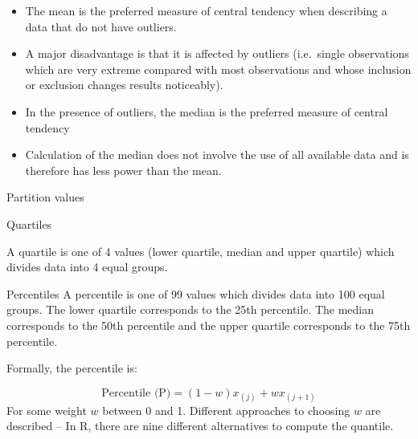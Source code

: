 \documentclass[
  ignorenonframetext,
  aspectratio=169]{beamer}
\providecommand{\tightlist}{%
  \setlength{\itemsep}{0pt}\setlength{\parskip}{0pt}}
\begin{document}
\begin{frame}{}
\protect\hypertarget{section-3}{}
\begin{itemize}
\tightlist
\item
  The mean is the preferred measure of central tendency when describing
  a data that do not have outliers.
\item
  A major disadvantage is that it is affected by outliers (i.e.~single
  observations which are very extreme compared with most observations
  and whose inclusion or exclusion changes results noticeably).
\item
  In the presence of outliers, the median is the preferred measure of
  central tendency
\item
  Calculation of the median does not involve the use of all available
  data and is therefore has less power than the mean.
\end{itemize}
\end{frame}

\begin{frame}{Partition values}
\protect\hypertarget{partition-values}{}
\begin{block}{Quartiles}

\small
A quartile is one of 4 values (lower quartile, median and upper quartile) which divides data into 4 equal groups.
\end{block}

\begin{block}{Percentiles}
\small
A percentile is one of 99 values which divides data into 100 equal groups. The lower quartile corresponds to the 25th percentile. The median corresponds to the 50th percentile and the upper quartile corresponds to the 75th percentile.

Formally, the percentile is:

$$
\text{Percentile (P)} = (1 - w)x_{(j)} + wx_{(j+1)}
$$
For some weight $w$ between 0 and 1. Different approaches to choosing $w$ are described -- In R, there are nine different alternatives to compute the quantile. 

\end{block}
\end{frame}
\end{document}
